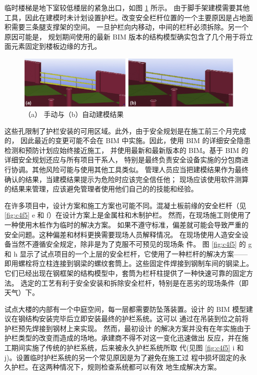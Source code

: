 临时楼梯是地下室较低楼层的紧急出口，如图 \ref{fig:c4f6} 所示。
由于脚手架建模需要其他工具，因此在建模时未计划设置护栏。改变安全栏杆位置的一个主要原因是占地面积需要三条腿支撑架的空间。
一旦护栏向内移动，中间的栏杆必须拆除。另一个原因可能是，
规划期间使用的最新 BIM 版本的结构模型确实包含了几个用于将立面元素固定到楼板边缘的方孔。

\begin{figure}[thbp!]
    \centering
    \includegraphics[width=1.0\linewidth]{res/c4f6.png}
    \caption{（a） 手动与（b）自动建模结果}
    \label{fig:c4f6}
\end{figure}

这些孔限制了护栏安装的可用区域。此外，由于安全规划是在施工前三个月完成的，
因此最近的变更可能不会在 BIM 中实施。因此，使用 BIM 的详细安全隐患检测和预防计划应始终接近施工，
并使用最新和最新版本的 BIM。基于 BIM 的详细安全规划还应与所有项目干系人，
特别是最终负责安全设备实施的分包商进行协调。其他风险可能与使用其他工具类似。
管理人员应当把建模结果作为最终确认的结果，当建模结果提示为危险时应该完全信任他；
现场应该使用软件测算的结果来管理，应该避免管理者使用他们自己的的技能和经验。

在许多项目中，设计方案和施工方案也可能不同。混凝土板前缘的安全栏杆（见\ref{fig:c4f5} e 和 f）在设计方案上是金属柱和木制护栏。
然而，在现场施工则使用了一种使用木桩作为临时的解决方案。
如果不遵守标准，偏差就可能会导致严重的安全问题。这种偏差和材料更换需要现场人员解释情况。
在现场使用人造安全设备当然不遵循安全规定，除非是为了克服不可预见的现场条
件。
图 \ref{fig:c4f5} 的 g 和 h 显示了试点项目的一个上层的安全栏杆，它使用了一种栏杆的解决方案——
即用螺栓将立柱连接到钢梁的螺纹套筒上。这些固定件焊接到钢制车间的钢梁上。
它们已经出现在钢框架的结构模型中，套筒为栏杆柱提供了一种快速可靠的固定方法。
选定的工艺有利于安全安装和拆除安全栏杆，特别是在恶劣的现场条件（即天气）下。


试点大楼的内部有一个中庭空间，每一层都需要防坠落装置。设计
的 BIM 模型建议在钢结构安装完毕后立即安装最终的护栏系统。这可以
通过在吊装到位之前将护栏预先焊接到钢材上来实现。
然而，最初设计
的解决方案并没有在年实施由于护栏类型的改变而造成的场地。承建商不得不对这一变化迅速做出
反应，并在施工期间实施了传统的护栏系统，后来被永久护栏系统所取
代(见图 \ref{fig:c4f5} i 和 j)。设置临时护栏系统的另一个常见原因是为了避免在施工过
程中损坏固定的永久护栏。在这两种情况下，规则检查系统都可以有效
地生成解决方案。\\

